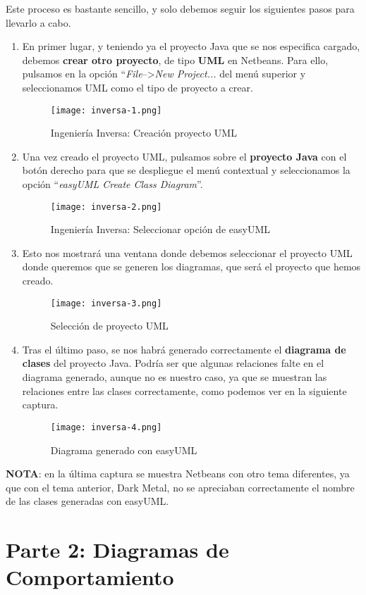 Este proceso es bastante sencillo, y solo debemos seguir los siguientes pasos para llevarlo a cabo.

\begin{enumerate}
    \item En primer lugar, y teniendo ya el proyecto Java que se nos especifica cargado, debemos \textbf{crear otro proyecto}, de tipo \textbf{UML} en Netbeans. Para ello, pulsamos en la opción ``\textit{File}-->\textit{New Project...} del menú superior y seleccionamos UML como el tipo de proyecto a crear.

    \begin{figure}[H]
        \centering
        \texttt{[image: inversa-1.png]}
        \caption{Ingeniería Inversa: Creación proyecto UML}
    \end{figure}

    \item Una vez creado el proyecto UML, pulsamos sobre el \textbf{proyecto Java} con el botón derecho para que se despliegue el menú contextual y seleccionamos la opción ``\textit{easyUML Create Class Diagram}''.

    \begin{figure}[H]
        \centering
        \texttt{[image: inversa-2.png]}
        \caption{Ingeniería Inversa: Seleccionar opción de easyUML}
    \end{figure}

    \item Esto nos mostrará una ventana donde debemos seleccionar el proyecto UML donde queremos que se generen los diagramas, que será el proyecto que hemos creado.

    \begin{figure}[H]
        \centering
        \texttt{[image: inversa-3.png]}
        \caption{Selección de proyecto UML}
    \end{figure}


    \item Tras el último paso, se nos habrá generado correctamente el \textbf{diagrama de clases} del proyecto Java. Podría ser que algunas relaciones falte en el diagrama generado, aunque no es nuestro caso, ya que se muestran las relaciones entre las clases correctamente, como podemos ver en la siguiente captura.

    \begin{figure}[H]
        \centering
        \texttt{[image: inversa-4.png]}
        \caption{Diagrama generado con easyUML}
    \end{figure}
\end{enumerate}

\textbf{NOTA}: en la última captura se muestra Netbeans con otro tema diferentes, ya que con el tema anterior, Dark Metal, no se apreciaban correctamente el nombre de las clases generadas con easyUML.

\section{Parte 2: Diagramas de Comportamiento}


%
%

